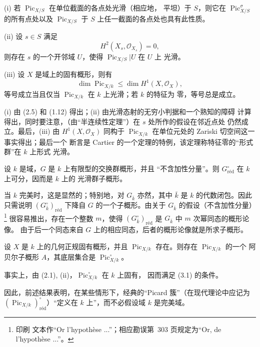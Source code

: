 
\noindent(i) 若 $\operatorname{Pic}_{X/S}$ 在单位截面的各点处光滑（相应地，
平坦）于 $S$，则它在 $\operatorname{Pic}_{X/S}^\sigma$ 的所有点处以及
$\operatorname{Pic}_{X/S}$ 于 $S$ 上任一截面的各点处也具有此性质。

\noindent(ii) 设 $s\in S$ 满足
\[
H^2(X_s,\mathcal O_{X_s})=0,
\]
则存在 $s$ 的一个开邻域 $U$，使得 $\operatorname{Pic}_{X/S}|U$ 在 $U$ 上
光滑。

\noindent(iii) 设 $X$ 是域上的固有概形，则有
\[
\dim\operatorname{Pic}_{X/k}\leq\dim H^1(X,\mathcal O_X),
\]
等号成立当且仅当 $\operatorname{Pic}_{X/k}$ 在 $k$ 上光滑；若 $k$ 的特征为
零，等号总是成立。

(i) 由 (2.5) 和 (1.12) 得出；(ii) 由光滑态射的无穷小判据和一个熟知的障碍
计算得出，同时要注意，（由“半连续性定理”）在 $s$ 处所作的假设在邻近点处
仍然成立。最后，(iii) 由 $H^1(X,\mathcal O_X)$ 同构于
$\operatorname{Pic}_{X/k}$ 在单位元处的 Zariski 切空间这一事实得出；最后一个
断言是 Cartier 的一个定理的特例，该定理称特征零的“形式群”在 $k$ 上形式
光滑。


 设 $k$ 是域，$G$ 是 $k$ 上有限型的交换群概形，并且
“不含加性分量”。则 $G_{\mathrm{réd}}^\circ$ 在 $k$ 上可分，因而是 $k$ 上的
光滑群子概形。

当 $k$ 完美时，这是显然的；特别地，对 $G_{\bar k}$ 亦然，其中 $\bar k$
是 $k$ 的代数闭包。因此只需说明 $(G_{\bar k}^\circ)_{\mathrm{réd}}$ 下降自
$G$ 的一个子概形。由关于 $G_{\bar k}$ 的假设（不含加性分量）\footnote{印刷
文本作“Or l'hypothèse ...”；相应勘误第~303 页规定为“Or, de l'hypothèse
...”。} 很容易推出，存在一个整数 $m$，使得
$(G_{\bar k}^\circ)_{\mathrm{réd}}$ 是 $G_{\bar k}$ 中 $m$ 次幂同态的概形论像。
由于后一个同态来自 $G$ 上的相应同态，后者的概形论像就是所求子概形。

 设 $X$ 是 $k$ 上的几何正规固有概形，并且
$\operatorname{Pic}_{X/k}$ 存在。则存在 $\operatorname{Pic}_{X/k}$ 的一个
阿贝尔子概形 $A$，其底层集合是 $\operatorname{Pic}_{X/k}^\circ$。

事实上，由 (2.1), (ii)，$\operatorname{Pic}_{X/k}^\circ$ 在 $k$ 上固有，
因而满足 (3.1) 的条件。


因此，前述结果表明，在某些情形下，经典的“Picard 簇”（在现代理论中应记为
$(\operatorname{Pic}_{X/k})_{\mathrm{réd}}^\circ$）“定义在 $k$ 上”，而不必假设域
$k$ 是完美域。

